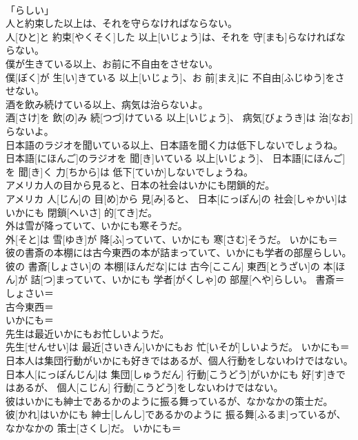 \documentclass[8pt]{extreport}
\begin{document}
\begin{CJK}{UTF8}{min}
\\	「らしい」
\\	人と約束した以上は、それを守らなければならない。	
\\	人[ひと]と 約束[やくそく]した 以上[いじょう]は、それを 守[まも]らなければならない。	
\\	僕が生きている以上、お前に不自由をさせない。	
\\	僕[ぼく]が 生[い]きている 以上[いじょう]、お 前[まえ]に 不自由[ふじゆう]をさせない。	
\\	酒を飲み続けている以上、病気は治らないよ。	
\\	酒[さけ]を 飲[の]み 続[つづ]けている 以上[いじょう]、 病気[びょうき]は 治[なお]らないよ。	
\\	日本語のラジオを聞いている以上、日本語を聞く力は低下しないでしょうね。	
\\	日本語[にほんご]のラジオを 聞[き]いている 以上[いじょう]、 日本語[にほんご]を 聞[き]く 力[ちから]は 低下[ていか]しないでしょうね。	
\\	アメリカ人の目から見ると、日本の社会はいかにも閉鎖的だ。	
\\	アメリカ 人[じん]の 目[め]から 見[み]ると、 日本[にっぽん]の 社会[しゃかい]はいかにも 閉鎖[へいさ] 的[てき]だ。	
\\	外は雪が降っていて、いかにも寒そうだ。	
\\	外[そと]は 雪[ゆき]が 降[ふ]っていて、いかにも 寒[さむ]そうだ。	いかにも＝ 
\\	彼の書斎の本棚には古今東西の本が詰まっていて、いかにも学者の部屋らしい。	
\\	彼の 書斎[しょさい]の 本棚[ほんだな]には 古今[ここん] 東西[とうざい]の 本[ほん]が 詰[つ]まっていて、いかにも 学者[がくしゃ]の 部屋[へや]らしい。	書斎＝しょさい＝ 
\\	古今東西＝ 
\\	いかにも＝ 
\\	先生は最近いかにもお忙しいようだ。	
\\	先生[せんせい]は 最近[さいきん]いかにもお 忙[いそが]しいようだ。	いかにも＝ 
\\	日本人は集団行動がいかにも好きではあるが、個人行動をしないわけではない。	
\\	日本人[にっぽんじん]は 集団[しゅうだん] 行動[こうどう]がいかにも 好[す]きではあるが、 個人[こじん] 行動[こうどう]をしないわけではない。	
\\	彼はいかにも紳士であるかのように振る舞っているが、なかなかの策士だ。	
\\	彼[かれ]はいかにも 紳士[しんし]であるかのように 振る舞[ふるま]っているが、なかなかの 策士[さくし]だ。	いかにも＝ 

\end{CJK}
\end{document}

